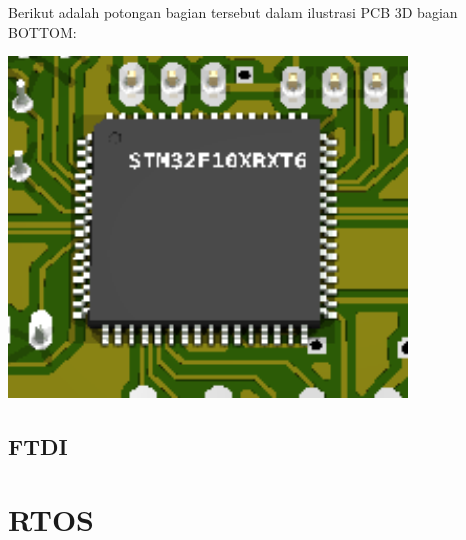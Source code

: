 \documentclass[11pt,fleqn]{book} %
\begin{document}
\begin{flushleft}
\begin{center}
\end{center}
Berikut adalah potongan bagian tersebut dalam ilustrasi PCB 3D bagian BOTTOM:
 \begin{center}
 \includegraphics[width=300pt]{./screenshot/stm32/stm322}\\
\end{center}
\end{flushleft}

\section{FTDI}

\newpage
{} %
\chapter{RTOS}
\end{document}
